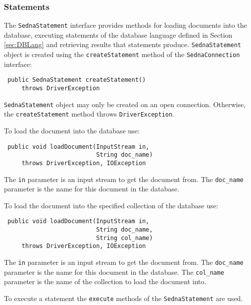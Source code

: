 \documentclass[a4paper,12pt]{article}
\begin{document}
\subsubsection{Statements}

The \verb!SednaStatement! interface provides methods for loading documents into
the database, executing statements of the database language defined in Section
\ref{sec:DBLang} and retrieving results that statements produce.
\verb!SednaStatement! object is created using the \verb!createStatement! method
of the \verb!SednaConnection! interface:

\begin{verbatim}
 public SednaStatement createStatement()
     throws DriverException
\end{verbatim}

\verb!SednaStatement! object may only be created on an open connection.
Otherwise, the \verb!createStatement! method throws \verb!DriverException!.

To load the document into the database use:

\begin{verbatim}
 public void loadDocument(InputStream in,
                          String doc_name)
     throws DriverException, IOException
\end{verbatim}

The \verb!in! parameter is an input stream to get the document from. The
\verb!doc_name! parameter is the name for this document in the database.

To load the document into the specified collection of the database use:

\begin{verbatim}
 public void loadDocument(InputStream in,
                          String doc_name,
                          String col_name)
     throws DriverException, IOException
\end{verbatim}

The \verb!in! parameter is an input stream to get the document from. The
\verb!doc_name! parameter is the name for this document in the database. The
\verb!col_name! parameter is the name of the collection to load the document
into.

To execute a statement the \verb!execute! methods of the \verb!SednaStatement!
are used.
\end{document}
